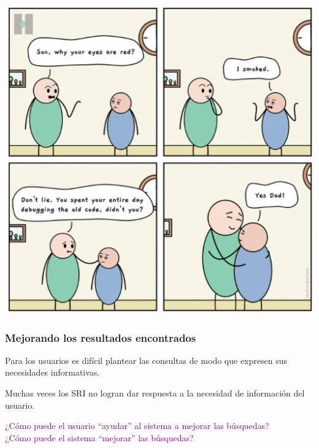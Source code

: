 \documentclass[
10pt, %
aspectratio=169, %
]{beamer}
\begin{document}
	\begin{frame}
		\centering
		\includegraphics[height=\paperheight]{break-1.png}
	\end{frame}


	\begin{frame}
		
		\frametitle{Mejorando los resultados encontrados}
		
		
		Para los usuarios es difícil plantear las consultas de modo que expresen sus necesidades informativas. 
		
		\vspace{1\baselineskip}
		Muchas veces los SRI no logran dar respuesta a la necesidad de información del usuario.
		
		\pause
		\vspace{3\baselineskip}
		\textcolor{purple}{¿Cómo puede el usuario ``ayudar'' al sistema a mejorar las búsquedas?} \\
		\textcolor{purple}{¿Cómo puede el sistema ``mejorar'' las búsquedas?}		
		
	\end{frame}
	
\end{document}
